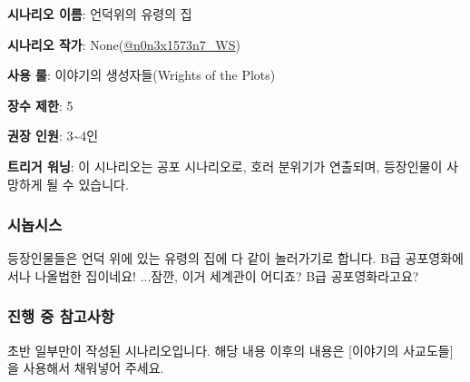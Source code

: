 \documentclass{report}
\begin{document}
	\textbf{시나리오 이름}: 언덕위의 유령의 집
	
	\textbf{시나리오 작가}: None(\href{https://www.twitter.com/n0n3x1573n7_WS}{@n0n3x1573n7\_WS})
	
	\textbf{사용 룰}: 이야기의 생성자들(Wrights of the Plots)
	
	\textbf{장수 제한}: 5
	
	\textbf{권장 인원}: 3\textasciitilde 4인
	
	\textbf{트리거 워닝}: 이 시나리오는 공포 시나리오로, 호러 분위기가 연출되며, 등장인물이 사망하게 될 수 있습니다.
	
	\subsubsection*{시놉시스}
	
	등장인물들은 언덕 위에 있는 유령의 집에 다 같이 놀러가기로 합니다. B급 공포영화에서나 나올법한 집이네요! ...잠깐, 이거 세계관이 어디죠? B급 공포영화라고요?
	
	\subsubsection*{진행 중 참고사항}
	초반 일부만이 작성된 시나리오입니다. 해당 내용 이후의 내용은 [이야기의 사교도들]을 사용해서 채워넣어 주세요.
	
\end{document}
